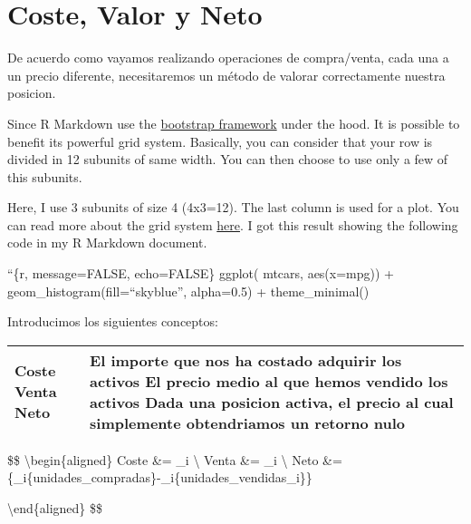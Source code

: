 \documentclass[
  twocolumn]{article}
\author{}
\date{\vspace{-2.5em}}
\begin{document}
\hypertarget{coste-valor-y-neto}{%
\section{Coste, Valor y Neto}\label{coste-valor-y-neto}}

De acuerdo como vayamos realizando operaciones de compra/venta, cada una
a un precio diferente, necesitaremos un método de valorar correctamente
nuestra posicion.

Since R Markdown use the
\href{https://getbootstrap.com/docs/4.0/layout/grid/}{bootstrap
framework} under the hood. It is possible to benefit its powerful grid
system. Basically, you can consider that your row is divided in 12
subunits of same width. You can then choose to use only a few of this
subunits.

Here, I use 3 subunits of size 4 (4x3=12). The last column is used for a
plot. You can read more about the grid system
\href{bootstrap\%20grid\%20system}{here}. I got this result showing the
following code in my R Markdown document.

``\{r, message=FALSE, echo=FALSE\} ggplot( mtcars, aes(x=mpg)) +
geom\_histogram(fill=``skyblue'', alpha=0.5) + theme\_minimal()

Introducimos los siguientes conceptos:

\begin{longtable}[]{@{}ll@{}}
\toprule
\endhead
\begin{minipage}[t]{0.14\columnwidth}\raggedright
\textbf{Coste} \textbf{Venta} \textbf{Neto}\strut
\end{minipage} & \begin{minipage}[t]{0.80\columnwidth}\raggedright
El importe que nos ha costado adquirir los activos El precio medio al
que hemos vendido los activos Dada una posicion activa, el precio al
cual simplemente obtendriamos un retorno nulo\strut
\end{minipage}\tabularnewline
\bottomrule
\end{longtable}

\$\$ \textbackslash begin\{aligned\} Coste \&=
\sum\_i \textbackslash{}
Venta \&= \sum\_i
\textbackslash{} Neto \&=
\{\sum\_i\{unidades\_compradas\}-\sum\_i\{unidades\_vendidas\_i\}\}

\textbackslash end\{aligned\} \$\$
\end{document}
